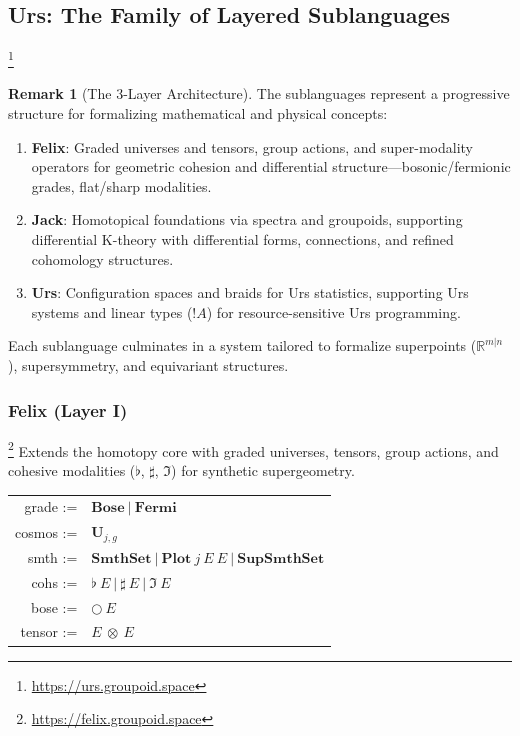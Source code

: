 \documentclass{article}
\theoremstyle{definition}
\newtheorem{remark}[definition]{Remark}
\theoremstyle{plain}
\begin{document}
\subsection{Urs: The Family of Layered Sublanguages}\footnote{\url{https://urs.groupoid.space}}

\begin{remark}[The 3-Layer Architecture]
The sublanguages represent a progressive structure for formalizing mathematical and
physical concepts:
\begin{enumerate}
  \item \textbf{Felix}: Graded universes and tensors, group
    actions, and super-modality operators for geometric cohesion and
    differential structure---bosonic/fermionic grades, flat/sharp modalities.
  \item \textbf{Jack}: Homotopical foundations via
    spectra and groupoids, supporting differential K-theory with differential
    forms, connections, and refined cohomology structures.
  \item \textbf{Urs}: Configuration spaces and braids for Urs
    statistics, supporting Urs systems and linear types ($!A$) for
    resource-sensitive Urs programming.
\end{enumerate}
Each sublanguage culminates in a system tailored to formalize superpoints
($\mathbb{R}^{m|n}$), supersymmetry, and equivariant structures.
\end{remark}

\newpage
\subsubsection{Felix (Layer I) \cite{schreibershulman12cohesive}}\footnote{\url{https://felix.groupoid.space}}
Extends the homotopy core with graded universes, tensors, group actions, and cohesive modalities ($\flat$, $\sharp$, $\Im$) for synthetic supergeometry.
\begin{table}[ht!]
\centering
\begin{tabular}{rl}
   grade :=&$\textbf{Bose}\ |\ \textbf{Fermi}$ \\
  cosmos :=&$\textbf{U}_{j,g}$ \\
    smth :=&$\textbf{SmthSet}\ |\ \textbf{Plot}\ j\ E\ E\ |\ \textbf{SupSmthSet}$ \\
    cohs :=&$\flat\ E\ |\ \sharp\ E\ |\ \Im\ E$ \\
    bose :=&$\bigcirc\ E$ \\
  tensor :=&$E\ \otimes\ E$ \\
\end{tabular}
\end{table}
\end{document}
